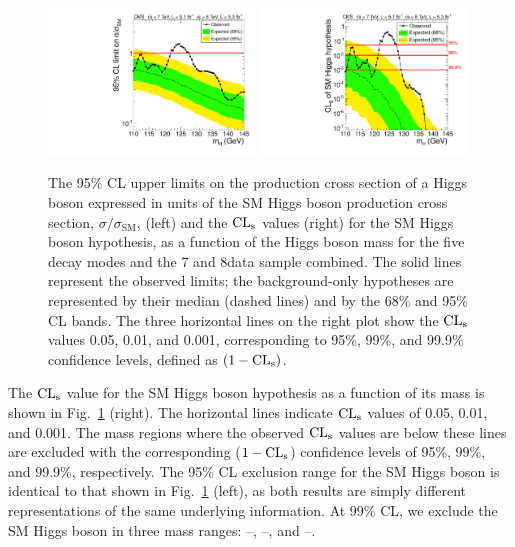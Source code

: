 \documentclass[11pt,twoside,a4paper,cmspaper,final,collab]{cms-tdr}
\begin{document}
\begin{figure} [b]
\centering
\includegraphics[width=0.49\textwidth]{figures/comb/sqr_acls_comb_HPA_smallGGScale} \hfill
\includegraphics[width=0.49\textwidth]{figures/comb/sqr_smacls_comb_HPA_smallGGScale}
\caption{ The 95\% CL upper limits on
the production cross section of a Higgs boson
expressed in units of the SM Higgs boson production cross section,
$\sigma / \sigma_\text{SM}$, (left)
and the $\mathrm{CL_s}$ values (right) for the SM Higgs boson hypothesis,
as a function of the Higgs boson mass for the five decay modes and the 7 and 8\TeV data sample combined.
The solid lines represent the observed limits;
the background-only hypotheses are represented by their median
(dashed lines) and by the 68\% and 95\% CL bands.
The three horizontal lines on the right plot show the $\mathrm{CL_s}$
values 0.05, 0.01, and 0.001,
corresponding to 95\%, 99\%, and 99.9\% confidence levels, defined as $(1-\mathrm{CL_s})$.
    }
\label{fig:CLsMu95}
\end{figure}


The $\mathrm{CL_s}$ value for the SM Higgs boson hypothesis as a function of its mass
is shown in Fig.~\ref{fig:CLsMu95} (right).
The horizontal lines indicate $\mathrm{CL_s}$ values of 0.05, 0.01, and 0.001.
The mass regions where the observed $\mathrm{CL_s}$ values are below these lines are excluded
with the corresponding ($1-\mathrm{CL_s}$) confidence levels of 95\%, 99\%, and 99.9\%, respectively.
The 95\% CL exclusion range for the SM Higgs boson is identical to that shown
in Fig.~\ref{fig:CLsMu95} (left), as both results
are simply different representations of the same underlying information.
At 99\% CL, we exclude the SM Higgs boson in three mass ranges:
\ObsOneNNL --\ObsOneNNH\GeV, \ObsTwoNNL --\ObsTwoNNH\GeV, and \ObsThreeNNL --\ObsThreeNNH\GeV.
\end{document}
